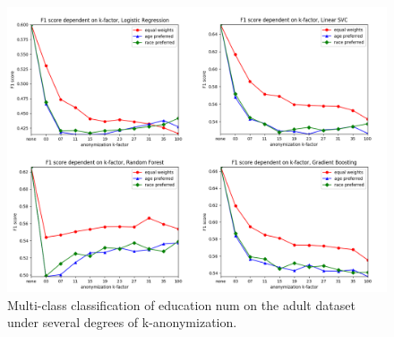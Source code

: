 \documentclass{llncs}
\begin{document}

\begin{figure}[H]
	\centering
	\includegraphics[width=1\textwidth]{figures/anonymization/adults_education_num/anon_education_combined}
	\caption{Multi-class classification of education num on the adult dataset under several degrees of k-anonymization.}
	\label{fig:results_anonymization_education_num}
\end{figure}
\end{document}
